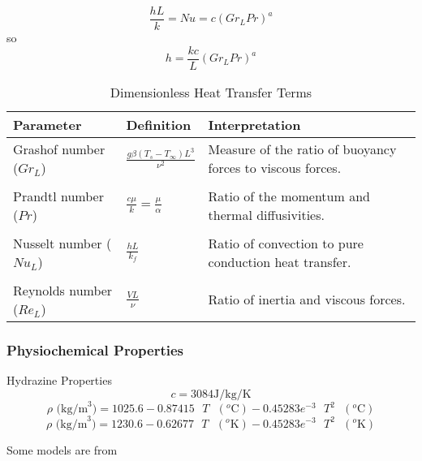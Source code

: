\begin{equation}
    \frac{h L}{k} = Nu = c(Gr_L Pr)^a
\end{equation}
%
so
%
\begin{equation}
       h = \frac{k c}{L}(Gr_L Pr)^a
\end{equation}
\begin{table}[ht]
\centering \caption{ Dimensionless Heat Transfer Terms
\cite{Incropera:06}}
\begin{tabular}{p{.65 in} p{.950 in} p{1.4 in}}
  \hline\hline
  Parameter & Definition & Interpretation \\
  \hline
  Grashof number ($Gr_L$) & \hspace{ 1 in} $\displaystyle\frac{g \beta(T_s - T_\infty)L^3}{\nu^2}$  & Measure of the ratio of buoyancy forces to viscous forces.\\
  & \\
  Prandtl number ($Pr$) & \hspace{ 1 in} $\displaystyle\frac{c \mu}{k} = \frac{\mu}{\alpha}$  & Ratio of the momentum and thermal diffusivities.\\
  & \\
  Nusselt number ($Nu_L$) & \hspace{ 1 in} $\displaystyle\frac{h L}{k_f}$ & Ratio of convection to pure conduction heat transfer.  \\
  & \\
  Reynolds number ($Re_L$) & \hspace{ 1 in} $\displaystyle\frac{V L}{\nu}$ & Ratio of inertia and viscous forces.  \\
  \hline
\end{tabular}
\end{table}

\subsubsection{ Physiochemical Properties }

Hydrazine Properties \cite{HydraBook}
\[
c = 3084 \mbox{J/kg/K}
\]
\[
\rho \mbox{ (kg/m}^3) = 1025.6 - 0.87415 \mbox{ }T \mbox{ }(^o\mbox{C})- 0.45283e^{-3}\mbox{ }T^2 \mbox{ }(^o\mbox{C})
\]
%
\[
\rho \mbox{ (kg/m}^3) = 1230.6 - 0.62677 \mbox{ }T \mbox{ }(^o\mbox{K})- 0.45283e^{-3}\mbox{ }T^2 \mbox{ }(^o\mbox{K})
\]


Some models are from \cite{Ricciardi:87}

